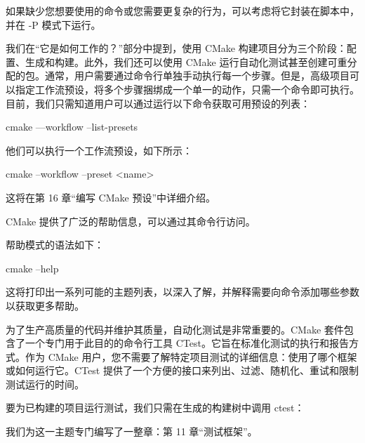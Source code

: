 如果缺少您想要使用的命令或您需要更复杂的行为，可以考虑将它封装在脚本中，并在 -P 模式下运行。


我们在“它是如何工作的？”部分中提到，使用 CMake 构建项目分为三个阶段：配置、生成和构建。此外，我们还可以使用 CMake 运行自动化测试甚至创建可重分配的包。通常，用户需要通过命令行单独手动执行每一个步骤。但是，高级项目可以指定工作流预设，将多个步骤捆绑成一个单一的动作，只需一个命令即可执行。目前，我们只需知道用户可以通过运行以下命令获取可用预设的列表：

\begin{shell}
cmake ––workflow --list-presets
\end{shell}

他们可以执行一个工作流预设，如下所示：

\begin{shell}
cmake --workflow --preset <name>
\end{shell}

这将在第 16 章“编写 CMake 预设”中详细介绍。


CMake 提供了广泛的帮助信息，可以通过其命令行访问。

帮助模式的语法如下：

\begin{shell}
cmake --help
\end{shell}

这将打印出一系列可能的主题列表，以深入了解，并解释需要向命令添加哪些参数以获取更多帮助。


为了生产高质量的代码并维护其质量，自动化测试是非常重要的。CMake 套件包含了一个专门用于此目的的命令行工具 CTest。它旨在标准化测试的执行和报告方式。作为 CMake 用户，您不需要了解特定项目测试的详细信息：使用了哪个框架或如何运行它。CTest 提供了一个方便的接口来列出、过滤、随机化、重试和限制测试运行的时间。

要为已构建的项目运行测试，我们只需在生成的构建树中调用 ctest：


我们为这一主题专门编写了一整章：第 11 章“测试框架”。

